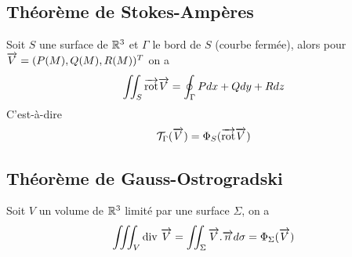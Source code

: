\subsection{Théorème de Stokes-Ampères}
Soit $S$ une surface de $\mathbb{R}^3$ et $\Gamma$ le bord de $S$ (courbe fermée), alors pour $\overrightarrow{V}=(P(M),Q(M),R(M))^T$ on a
\[
    \iint_S\overrightarrow{\textrm{rot}}\overrightarrow{V}
    =\oint_\Gamma Pdx+Qdy+Rdz
\]
C'est-à-dire
\[
    \mathcal T_\Gamma(\overrightarrow{V})=
    \Phi_S(\overrightarrow{\textrm{rot}}\overrightarrow{V})
\]

\subsection{Théorème de Gauss-Ostrogradski}
Soit $V$ un volume de $\mathbb{R}^3$ limité par une surface $\Sigma$, on a
\[
    \iiint_V\textrm{div }\overrightarrow{V}=
    \iint_\Sigma\overrightarrow{V}.\overrightarrow{n}d\sigma=
    \Phi_\Sigma(\overrightarrow{V})
\]